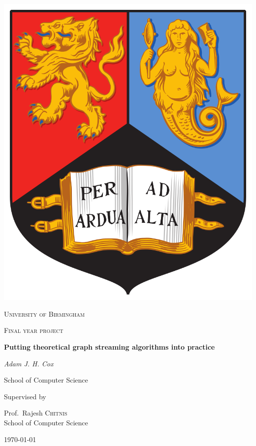 \begin{titlepage}


\thispagestyle{empty}
\setlength\headheight{0pt} 
\begin{center}

    \begin{center}
        \includegraphics[width=0.25\linewidth]{img/uob.PNG}            
    \end{center}	

    \vspace{0.25cm}
    {\scshape\LARGE University of Birmingham \par}
    \vspace{0.25cm}
    {\scshape\Large Final year project\par}
    \vspace{0.5cm}

    {\Large\bfseries Putting theoretical graph streaming algorithms into practice\par}
    
    \vspace{0.5cm}
    {\Large\itshape Adam J. H. Cox\par}
    School of Computer Science
    \vspace{0.25cm}

    \vspace{1cm}
    Supervised by\par
    Prof.~Rajesh \textsc{Chitnis} \\
    School of Computer Science\par
    \vspace{1.5cm}
    \large
    \today

\end{center}

\clearpage
\restoregeometry
\end{titlepage}
